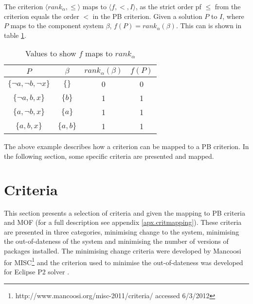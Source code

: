 The criterion $\langle rank_{\alpha}, \leq \rangle$ maps to $\langle f, < , I \rangle$,
as the strict order pf $\leq$ from the criterion equals the order $<$ in the PB criterion.
Given a solution $P$ to $I$, where $P$ maps to the component system $\beta$, $f(P) = rank_{\alpha}(\beta)$.
This can is shown in table \ref{impl.critmapexmp}.
\begin{table}[h!]
\centering
\begin{tabular}{| c | c | c | c |}
\hline
$P$                                &    $\beta$            & $rank_{\alpha}(\beta)$     & $f(P)$\\ \hline    
$\{\neg a, \neg b, \neg x\}$     & $\{\}$                & 0                        & 0 \\
$\{\neg a,  b, x\}$             & $\{b\}$                & 1                        & 1 \\
$\{ a,  \neg b, x\}$             & $\{a\}$                & 1                        & 1 \\
$\{ a,  b, x\}$                 & $\{a,b\}$                & 1                        & 1 \\ \hline
\end{tabular}
\caption{Values to show $f$  maps to $rank_{\alpha}$}
\label{impl.critmapexmp}
\end{table}

The above example describes how a \modelname criterion can be mapped to a PB criterion.
In the following section, some specific criteria are presented and mapped.

\section{Criteria}
\label{impl.criteria}
This section presents a selection of  \modelname criteria and given the mapping to PB criteria and MOF (for a full description see appendix \ref{apx.critmapping}).
These criteria are presented in three categories, minimising change to the system, minimising the out-of-dateness of the system and minimising the number of versions of packages installed.
The minimising change criteria were developed by Mancoosi for MISC\footnote{http://www.mancoosi.org/misc-2011/criteria/ accessed 6/3/2012}
and the criterion used to minimise the out-of-dateness was developed for Eclipse P2 solver \citep{leBerre2010}.

